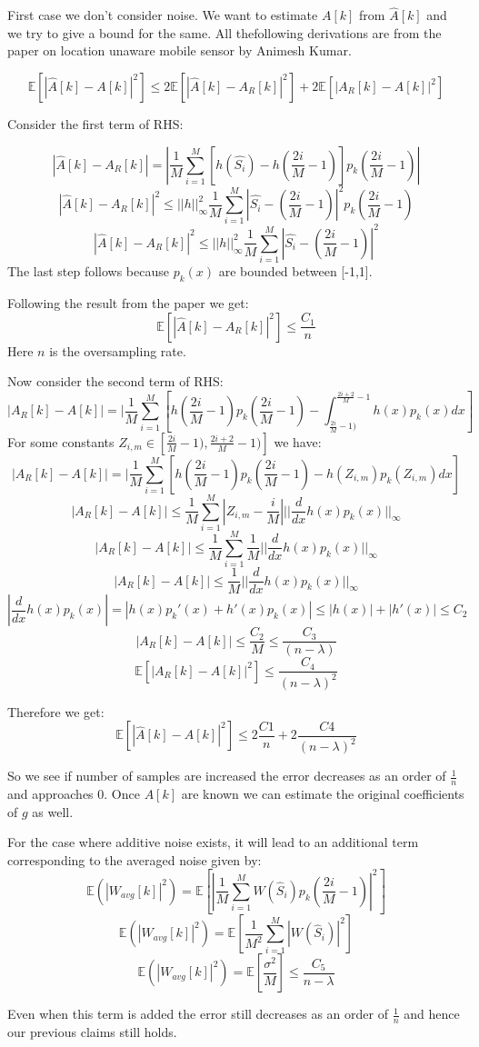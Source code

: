 \documentclass{article}
\begin{document}
First case we don't consider noise. We want to estimate $A[k]$ from $\hat{A}[k]$ and we try to give a bound for the same. All thefollowing derivations are from the paper on location unaware mobile sensor by Animesh Kumar.

$$\mathbb{E}[|\hat{A}[k] - A[k]|^2] \le 2 \mathbb{E}[|\hat{A}[k] - A_R[k]|^2] + 2 \mathbb{E}[|A_R[k] - A[k]|^2]$$

Consider the first term of RHS:

$$|\hat{A}[k] - A_R[k]| = |\frac{1}{M}\sum_{i=1}^M[h(\hat{S_i}) - h(\frac{2i}{M} -1)]p_k(\frac{2i}{M} -1)|$$
$$|\hat{A}[k] - A_R[k]|^2 \le ||h||_{\infty}^2 \frac{1}{M}\sum_{i=1}^M |\hat{S_i} - (\frac{2i}{M} -1)|^2 p_k(\frac{2i}{M}-1)$$
$$|\hat{A}[k] - A_R[k]|^2 \le ||h||_{\infty}^2 \frac{1}{M}\sum_{i=1}^M |\hat{S_i} - (\frac{2i}{M} -1)|^2$$
The last step follows because $p_k(x)$ are bounded between [-1,1].

Following the result from the paper we get:
$$\mathbb{E}[|\hat{A}[k] - A_R[k]|^2] \le \frac{C_1}{n}$$
Here $n$ is the oversampling rate.

Now consider the second term of RHS:
$$|A_R[k] - A[k]| = |\frac{1}{M} \sum_{i=1}^M [h(\frac{2i}{M} -1)p_k(\frac{2i}{M} -1) - \int_{\frac{2i}{M} -1)}^{\frac{2i+2}{M}-1}h(x)p_k(x)dx]$$
For some constants $Z_{i,m} \in [\frac{2i}{M} -1), \frac{2i+2}{M} -1)]$ we have:
$$|A_R[k] - A[k]| = |\frac{1}{M} \sum_{i=1}^M [h(\frac{2i}{M} -1)p_k(\frac{2i}{M} -1) - h(Z_{i,m})p_k(Z_{i,m})dx]$$
$$|A_R[k] - A[k]| \le \frac{1}{M}\sum_{i=1}^M |Z_{i,m} - \frac{i}{M}| ||\frac{d}{dx}h(x)p_k(x)||_{\infty}$$
$$|A_R[k] - A[k]| \le \frac{1}{M}\sum_{i=1}^M \frac{1}{M} ||\frac{d}{dx}h(x)p_k(x)||_{\infty}$$
$$|A_R[k] - A[k]| \le \frac{1}{M} ||\frac{d}{dx}h(x)p_k(x)||_{\infty}$$
$$|\frac{d}{dx}h(x)p_k(x)| = |h(x)p_k'(x) + h'(x)p_k(x)| \le |h(x)| + |h'(x)| \le C_2$$
$$|A_R[k] - A[k]| \le \frac{C_2}{M} \le \frac{C_3}{(n-\lambda)}$$
$$\mathbb{E}[|A_R[k] - A[k]|^2] \le \frac{C_4}{(n-\lambda)^2}$$

Therefore we get:
$$\mathbb{E}[|\hat{A}[k] - A[k]|^2] \le 2 \frac{C1}{n} + 2 \frac{C4}{(n-\lambda)^2}$$

So we see if number of samples are increased the error decreases as an order of $\frac{1}{n}$ and approaches 0. Once $A[k]$ are known we can estimate the original coefficients of $g$ as well.

For the case where additive noise exists, it will lead to an additional term corresponding to the averaged noise given by:
$$\mathbb{E}(|W_{avg}[k]|^2) = \mathbb{E}[|\frac{1}{M}\sum_{i=1}^M W(\hat{S}_i)p_k(\frac{2i}{M}-1)|^2]$$
$$\mathbb{E}(|W_{avg}[k]|^2) = \mathbb{E}[\frac{1}{M^2}\sum_{i=1}^M |W(\hat{S}_i)|^2]$$
$$\mathbb{E}(|W_{avg}[k]|^2) = \mathbb{E}[\frac{\sigma^2}{M}] \le \frac{C_5}{n-\lambda}$$

Even when this term is added the error still decreases as an order of $\frac{1}{n}$ and hence our previous claims still holds.
\end{document}
